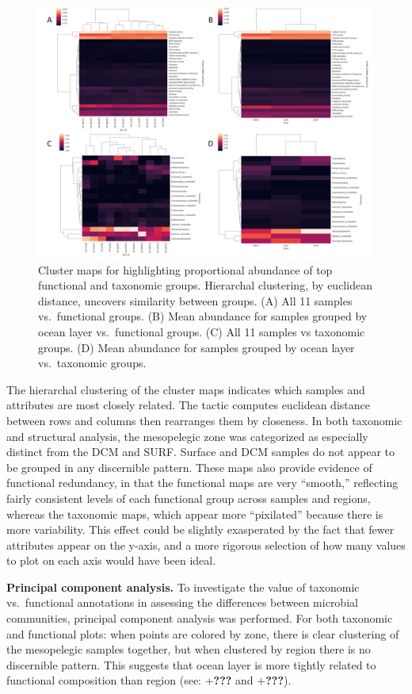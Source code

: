 \documentclass[12pt,a4paper,]{article}
\begin{document}
\begin{figure}
\centering
\includegraphics{imgs/cluster.png}
\caption{Cluster maps for highlighting proportional abundance of top
functional and taxonomic groups. Hierarchal clustering, by euclidean
distance, uncovers similarity between groups. (A) All 11 samples
vs.~functional groups. (B) Mean abundance for samples grouped by ocean
layer vs.~functional groups. (C) All 11 samples vs taxonomic groups. (D)
Mean abundance for samples grouped by ocean layer vs.~taxonomic
groups.\label{fig:cluster}}
\end{figure}

The hierarchal clustering of the cluster maps indicates which samples
and attributes are most closely related. The tactic computes euclidean
distance between rows and columns then rearranges them by closeness. In
both taxonomic and structural analysis, the mesopelegic zone was
categorized as especially distinct from the DCM and SURF. Surface and
DCM samples do not appear to be grouped in any discernible pattern.
These maps also provide evidence of functional redundancy, in that the
functional maps are very ``smooth,'' reflecting fairly consistent levels
of each functional group across samples and regions, whereas the
taxonomic maps, which appear more ``pixilated'' because there is more
variability. This effect could be slightly exasperated by the fact that
fewer attributes appear on the y-axis, and a more rigorous selection of
how many values to plot on each axis would have been ideal.

\textbf{Principal component analysis.} To investigate the value of
taxonomic vs.~functional annotations in assessing the differences
between microbial communities, principal component analysis was
performed. For both taxonomic and functional plots: when points are
colored by zone, there is clear clustering of the mesopelegic samples
together, but when clustered by region there is no discernible pattern.
This suggests that ocean layer is more tightly related to functional
composition than region (see: +\textbf{???} and +\textbf{???}).
\end{document}
